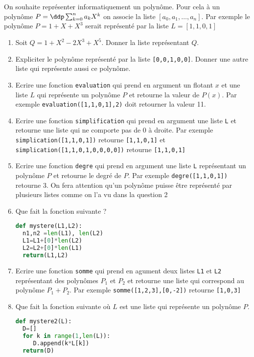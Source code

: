 \documentclass[a4paper, 11pt,reqno]{article}
\begin{document}
\begin{exercice}
On souhaite représenter informatiquement un polynôme. Pour cela à un polynôme $P=\ddp \sum_{k=0}^n a_k X^k$ on associe la liste 
$[a_0, a_1, \dots, a_n]$. Par exemple le polynôme $P=1+X+X^3$ serait représenté par la liste $L=[1,1,0,1]$
\begin{enumerate}
\item Soit $Q=1+X^2- 2X^3 +X^5$. Donner la liste représentant $Q$. 
\item Expliciter le polynôme représenté par la liste \texttt{[0,0,1,0,0]}. Donner une autre liste qui représente aussi ce polynôme. 
\item Ecrire une fonction \texttt{evaluation} qui prend en argument un flotant $x$ et  une liste $L$  qui représente un polynôme $P$ et retourne la valeur de $P(x)$.
Par exemple \texttt{evaluation([1,1,0,1],2)} doit retourner la valeur 11.
\item 
Ecrire une fonction \texttt{simplification} qui prend en argument une liste \texttt{L} et retourne une liste qui ne comporte pas de $0$ à droite. 
Par exemple \texttt{simplication([1,1,0,1])} retourne \texttt{[1,1,0,1]} et 
 \texttt{simplication([1,1,0,1,0,0,0,0])} retourne \texttt{[1,1,0,1]} 
 
\item Ecrire une fonction \texttt{degre} qui prend en argument une liste \texttt{L} représentant un polynôme $P$ et retourne le degré de $P$. Par exemple \texttt{degre([1,1,0,1])} retourne 3. On fera attention qu'un polynôme puisse être représenté par plusieurs listes comme on l'a vu dans la question 2

\item  Que fait la fonction suivante ?
\begin{lstlisting}[language =Python]
def mystere(L1,L2):
  n1,n2 =len(L1), len(L2)
  L1=L1+[0]*len(L2)
  L2=L2+[0]*len(L1)
  return(L1,L2) 
\end{lstlisting}

\item Ecrire une fonction \texttt{somme} qui prend en agument deux listes \texttt{L1} et \texttt{L2} représentant des polynômes $P_1$ et $P_2$ et retourne une liste qui correspond au polynôme $P_1+P_2$.
Par exemple \texttt{somme([1,2,3],[0,-2])} retourne \texttt{[1,0,3]}
\item Que fait la fonction suivante où $L$ est une liste qui représente un polynôme $P$. 
\begin{lstlisting}[language=Python]
def mystere2(L):
  D=[]
  for k in range(1,len(L)):
     D.append(k*L[k])
  return(D)
\end{lstlisting}


\end{enumerate}
\end{exercice}
\end{document}

